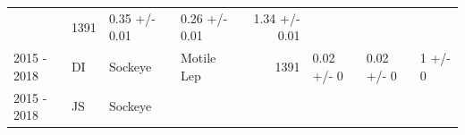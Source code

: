 \documentclass[fleqn,10pt]{wlpeerj} %
\begin{document}
\begin{longtable}[]{@{}llllrlll@{}}
\begin{minipage}[t]{0.11\columnwidth}
\end{minipage} & \begin{minipage}[t]{0.04\columnwidth}\raggedleft\strut
1391\strut
\end{minipage} & \begin{minipage}[t]{0.14\columnwidth}\raggedright\strut
0.35 +/- 0.01\strut
\end{minipage} & \begin{minipage}[t]{0.14\columnwidth}\raggedright\strut
0.26 +/- 0.01\strut
\end{minipage} & \begin{minipage}[t]{0.14\columnwidth}\raggedright\strut
1.34 +/- 0.01\strut
\end{minipage}\tabularnewline
\begin{minipage}[t]{0.09\columnwidth}\raggedright\strut
2015 - 2018\strut
\end{minipage} & \begin{minipage}[t]{0.06\columnwidth}\raggedright\strut
DI\strut
\end{minipage} & \begin{minipage}[t]{0.06\columnwidth}\raggedright\strut
Sockeye\strut
\end{minipage} & \begin{minipage}[t]{0.11\columnwidth}\raggedright\strut
Motile Lep\strut
\end{minipage} & \begin{minipage}[t]{0.04\columnwidth}\raggedleft\strut
1391\strut
\end{minipage} & \begin{minipage}[t]{0.14\columnwidth}\raggedright\strut
0.02 +/- 0\strut
\end{minipage} & \begin{minipage}[t]{0.14\columnwidth}\raggedright\strut
0.02 +/- 0\strut
\end{minipage} & \begin{minipage}[t]{0.14\columnwidth}\raggedright\strut
1 +/- 0\strut
\end{minipage}\tabularnewline
\begin{minipage}[t]{0.09\columnwidth}\raggedright\strut
2015 - 2018\strut
\end{minipage} & \begin{minipage}[t]{0.06\columnwidth}\raggedright\strut
JS\strut
\end{minipage} & \begin{minipage}[t]{0.06\columnwidth}\raggedright\strut
Sockeye\strut
\end{minipage} & \begin{minipage}[t]{0.11\columnwidth}\raggedright\strut

\end{minipage}
\end{longtable}
\end{document}
